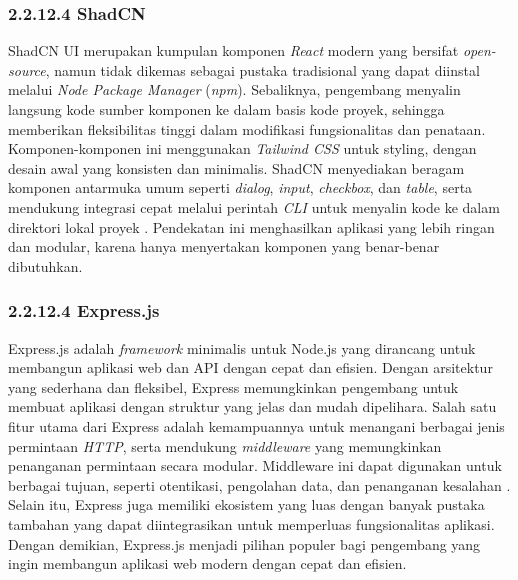 \subsubsection{2.2.12.4 ShadCN}

ShadCN UI merupakan kumpulan komponen \emph{React} modern yang bersifat \emph{open-source}, namun tidak dikemas sebagai pustaka tradisional yang dapat diinstal melalui \emph{Node Package Manager} (\emph{npm}). Sebaliknya, pengembang menyalin langsung kode sumber komponen ke dalam basis kode proyek, sehingga memberikan fleksibilitas tinggi dalam modifikasi fungsionalitas dan penataan. Komponen-komponen ini menggunakan \emph{Tailwind CSS} untuk styling, dengan desain awal yang konsisten dan minimalis. ShadCN menyediakan beragam komponen antarmuka umum seperti \emph{dialog}, \emph{input}, \emph{checkbox}, dan \emph{table}, serta mendukung integrasi cepat melalui perintah \emph{CLI} untuk menyalin kode ke dalam direktori lokal proyek \cite{Shadcn2024}. Pendekatan ini menghasilkan aplikasi yang lebih ringan dan modular, karena hanya menyertakan komponen yang benar-benar dibutuhkan.

\subsubsection{2.2.12.4 Express.js}
Express.js adalah \emph{framework} minimalis untuk Node.js yang dirancang untuk membangun aplikasi web dan API dengan cepat dan efisien. Dengan arsitektur yang sederhana dan fleksibel, Express memungkinkan pengembang untuk membuat aplikasi dengan struktur yang jelas dan mudah dipelihara. Salah satu fitur utama dari Express adalah kemampuannya untuk menangani berbagai jenis permintaan \emph{HTTP}, serta mendukung \emph{middleware} yang memungkinkan penanganan permintaan secara modular. Middleware ini dapat digunakan untuk berbagai tujuan, seperti otentikasi, pengolahan data, dan penanganan kesalahan \cite{express2023docs}. Selain itu, Express juga memiliki ekosistem yang luas dengan banyak pustaka tambahan yang dapat diintegrasikan untuk memperluas fungsionalitas aplikasi. Dengan demikian, Express.js menjadi pilihan populer bagi pengembang yang ingin membangun aplikasi web modern dengan cepat dan efisien.

